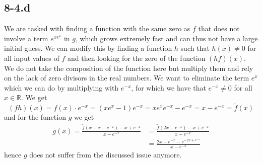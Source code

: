 \documentclass{article}
\begin{document}
\subsection*{8-4.d}
We are tasked with finding a function with the same zero as $f$ that does not involve a term $e^{xe^{x}}$ in $g$, which grows extremely fast and can thus not have a large initial guess. We can modify this by finding a function $h$ such that $h\left(x\right) \neq 0$ for all input values of $f$ and then looking for the zero of the function $\left(hf\right)\left(x\right)$. We do not take the composition of the function here but multiply them and rely on the lack of zero divisors in the real numbers. We want to eliminate the term $e^{x}$ which we can do by multiplying with $e^{-x}$, for which we have that $e^{-x}\neq 0$ for all $x\in \mathbb{R}$. We get 
\begin{equation*}
    \left(fh\right)\left(x\right) = f\left(x\right) \cdot e^{-x} =  \left(xe^{x}-1\right)e^{-x} = xe^{x}e^{-x} - e^{-x} = x -e^{-x} = \tilde{f}\left(x\right)
\end{equation*}
and for the function $g$ we get
\begin{align*}
    g\left(x\right) = \frac{\tilde{f}\left(x + x -e^{-x}\right) - x + e^{-x}}{x- e^{-x}} &= \frac{\tilde{f}\left(2x - e^{-x}\right) -x + e^{-x}}{x - e^{-x}}\\ 
    &= \frac{2x - e^{-x} - e^{-2x+e^{-x}}}{x-e^{-x}}
\end{align*}
hence $g$ does not suffer from the discussed issue anymore.
\end{document}
